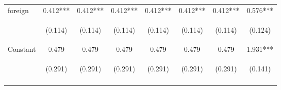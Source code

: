 \begin{center}
\begin{tabular}{lccccccc}
foreign & 0.412*** & 0.412*** & 0.412*** & 0.412*** & 0.412*** & 0.412*** & 0.576*** \\
\vspace{4pt} & \begin{footnotesize}(0.114)\end{footnotesize} & \begin{footnotesize}(0.114)\end{footnotesize} & \begin{footnotesize}(0.114)\end{footnotesize} & \begin{footnotesize}(0.114)\end{footnotesize} & \begin{footnotesize}(0.114)\end{footnotesize} & \begin{footnotesize}(0.114)\end{footnotesize} & \begin{footnotesize}(0.124)\end{footnotesize} \\
Constant & 0.479 & 0.479 & 0.479 & 0.479 & 0.479 & 0.479 & 1.931*** \\
 & \begin{footnotesize}(0.291)\end{footnotesize} & \begin{footnotesize}(0.291)\end{footnotesize} & \begin{footnotesize}(0.291)\end{footnotesize} & \begin{footnotesize}(0.291)\end{footnotesize} & \begin{footnotesize}(0.291)\end{footnotesize} & \begin{footnotesize}(0.291)\end{footnotesize} & \begin{footnotesize}(0.141)\end{footnotesize} \\
\vspace{4pt} & \begin{footnotesize}\end{footnotesize} & \begin{footnotesize}\end{footnotesize} & \begin{footnotesize}\end{footnotesize} & \begin{footnotesize}\end{footnotesize} & \begin{footnotesize}\end{footnotesize} & \begin{footnotesize}\end{footnotesize} & \begin{footnotesize}\end{footnotesize} \\

\end{tabular}
\end{center}
